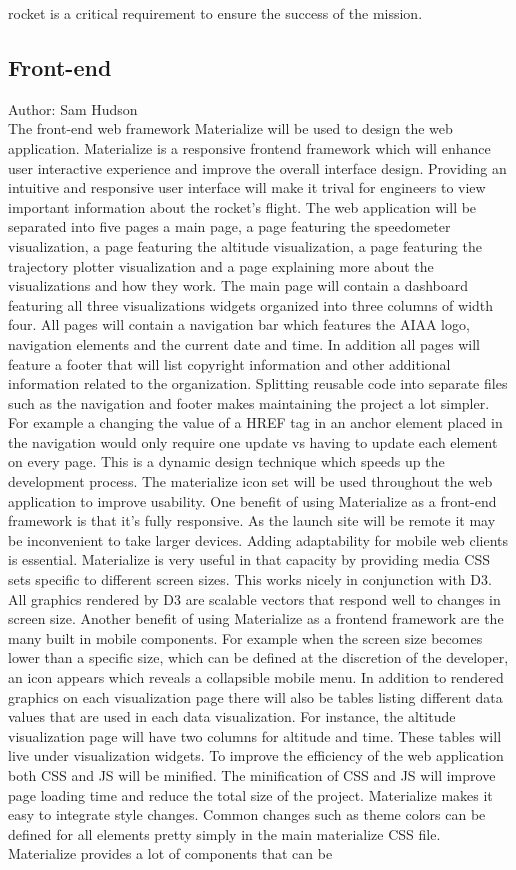 \documentclass[onecolumn, draftclsnofoot,10pt, compsoc]{IEEEtran}
\begin{document}
rocket is a critical requirement to ensure the success of the mission. 
\subsection {Front-end}
Author: Sam Hudson\\
The front-end web framework Materialize will be used to design the web application. Materialize is a responsive frontend framework which will enhance user interactive experience and improve the overall interface design. Providing an intuitive and responsive user interface will make it trival for engineers to view important information about the rocket’s flight. The web application will be separated into five pages a main page, a page featuring the speedometer visualization, a page featuring the altitude visualization, a page featuring the trajectory plotter visualization and a page explaining more about the visualizations and how they work. The main page will contain a dashboard featuring all three visualizations widgets organized into three columns of width four. All pages will contain a navigation bar which features the AIAA logo, navigation elements and the current date and time. In addition all pages will feature a footer that will list copyright information and other additional information related to the organization. Splitting reusable code into separate files such as the navigation and footer makes maintaining the project a lot simpler. For example a changing the value of a HREF tag in an anchor element placed in the navigation would only require one update vs having to update each element on every page. This is a dynamic design technique which speeds up the development process. The materialize icon set will be used throughout the web application to improve usability. One benefit of using Materialize as a front-end framework is that it’s fully responsive. As the launch site will be remote it may be inconvenient to take larger devices. Adding adaptability for mobile web clients is essential. Materialize is very useful in that capacity by providing media CSS sets specific to different screen sizes. This works nicely in conjunction with D3. All graphics rendered by D3 are scalable vectors that respond well to changes in screen size. Another benefit of using Materialize as a frontend framework are the many built in mobile components. For example when the screen size becomes lower than a specific size, which can be defined at the discretion of the developer, an icon appears which reveals a collapsible mobile menu. In addition to rendered graphics on each visualization page there will also be tables listing different data values that are used in each data visualization. For instance, the altitude visualization page will have two columns for altitude and time. These tables will live under visualization widgets. To improve the efficiency of the web application both CSS and JS will be minified. The minification of CSS and JS will improve page loading time and reduce the total size of the project. Materialize makes it easy to integrate style changes. Common changes such as theme colors can be defined for all elements pretty simply in the main materialize CSS file. Materialize provides a lot of components that can be 
\end{document}
